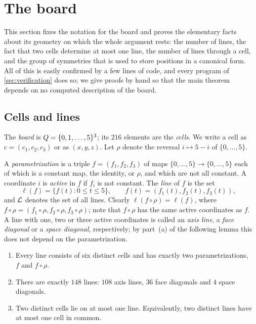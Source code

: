\section{The board}\label{sec:board}

This section fixes the notation for the board and proves the elementary facts about its geometry on
which the whole argument rests: the number of lines, the fact that two cells determine at most one line,
the number of lines through a cell, and the group of symmetries that is used to store positions in a
canonical form. All of this is easily confirmed by a few lines of code, and every program of
\cref{sec:verification} does so; we give proofs by hand so that the main theorem depends on no computed
description of the board.

\subsection{Cells and lines}\label{ssec:lines}

The \emph{board} is $Q=\{0,1,\dots,5\}^3$; its $216$ elements are the \emph{cells}. We write a cell as
$c=(c_1,c_2,c_3)$ or as $(x,y,z)$. Let $\rho$ denote the reversal $i\mapsto 5-i$ of $\{0,\dots,5\}$.

A \emph{parametrization} is a triple $f=(f_1,f_2,f_3)$ of maps $\{0,\dots,5\}\to\{0,\dots,5\}$ each of which
is a constant map, the identity, or $\rho$, and which are not all constant. A coordinate $i$ is
\emph{active} in $f$ if $f_i$ is not constant. The \emph{line} of $f$ is the set
\[
  \ell(f)=\{f(t) : 0\le t\le 5\},\qquad f(t)=(f_1(t),f_2(t),f_3(t)),
\]
and $\mathcal{L}$ denotes the set of all lines. Clearly $\ell(f\circ\rho)=\ell(f)$, where
$f\circ\rho=(f_1\circ\rho,f_2\circ\rho,f_3\circ\rho)$; note that $f\circ\rho$ has the same active coordinates
as $f$. A line with one, two or three active coordinates is called an \emph{axis line}, a \emph{face
diagonal} or a \emph{space diagonal}, respectively; by part~(a) of the following lemma this does not
depend on the parametrization.

\begin{lemma}\label{lem:geometry}
\begin{enumerate}[label=\textup{(\alph*)}]
\item Every line consists of six distinct cells and has exactly two parametrizations, $f$ and $f\circ\rho$.
\item There are exactly $148$ lines: $108$ axis lines, $36$ face diagonals and $4$ space diagonals.
\item Two distinct cells lie on at most one line. Equivalently, two distinct lines have at most one cell in
      common.
\end{enumerate}
\end{lemma}

